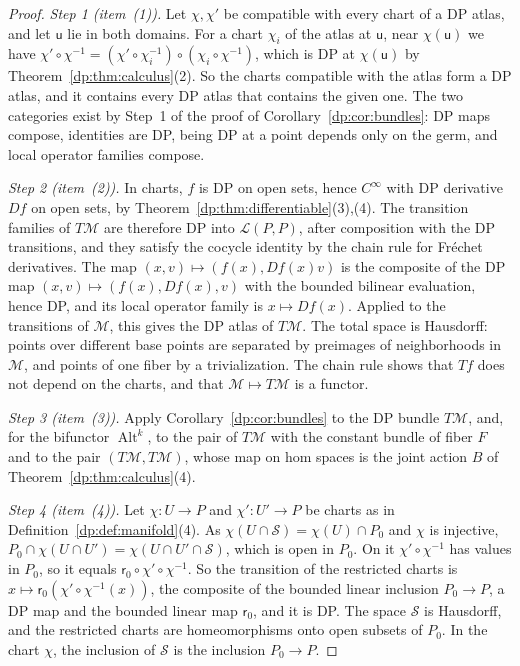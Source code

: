 \documentclass[11pt]{amsart}
\theoremstyle{definition}
\theoremstyle{remark}
\numberwithin{equation}{section}
\newcommand{\cL}{\mathcal L}
\newcommand{\Alt}{\operatorname{Alt}}
\theoremstyle{plain}
\theoremstyle{definition}
\theoremstyle{plain}
\newcommand{\cS}{\mathcal S}
\begin{document}
\begin{proof}
\emph{Step 1 (item~(1)).} Let $\chi,\chi'$ be compatible with every chart of a DP atlas, and let $\mathsf u$ lie in both domains. For a chart $\chi_i$ of the atlas at $\mathsf u$, near $\chi(\mathsf u)$ we have $\chi'\circ\chi^{-1}=(\chi'\circ\chi_i^{-1})\circ(\chi_i\circ\chi^{-1})$, which is DP at $\chi(\mathsf u)$ by Theorem~\ref{dp:thm:calculus}(2). So the charts compatible with the atlas form a DP atlas, and it contains every DP atlas that contains the given one. The two categories exist by Step~1 of the proof of Corollary~\ref{dp:cor:bundles}: DP maps compose, identities are DP, being DP at a point depends only on the germ, and local operator families compose.

\emph{Step 2 (item~(2)).} In charts, $f$ is DP on open sets, hence $C^\infty$ with DP derivative $Df$ on open sets, by Theorem~\ref{dp:thm:differentiable}(3),(4). The transition families of $T\mathcal M$ are therefore DP into $\cL(P,P)$, after composition with the DP transitions, and they satisfy the cocycle identity by the chain rule for Fr\'echet derivatives. The map $(x,v)\mapsto(f(x),Df(x)v)$ is the composite of the DP map $(x,v)\mapsto(f(x),Df(x),v)$ with the bounded bilinear evaluation, hence DP, and its local operator family is $x\mapsto Df(x)$. Applied to the transitions of $\mathcal M$, this gives the DP atlas of $T\mathcal M$. The total space is Hausdorff: points over different base points are separated by preimages of neighborhoods in $\mathcal M$, and points of one fiber by a trivialization. The chain rule shows that $Tf$ does not depend on the charts, and that $\mathcal M\mapsto T\mathcal M$ is a functor.

\emph{Step 3 (item~(3)).} Apply Corollary~\ref{dp:cor:bundles} to the DP bundle $T\mathcal M$, and, for the bifunctor $\Alt^k$, to the pair of $T\mathcal M$ with the constant bundle of fiber $F$ and to the pair $(T\mathcal M,T\mathcal M)$, whose map on hom spaces is the joint action $B$ of Theorem~\ref{dp:thm:calculus}(4).

\emph{Step 4 (item~(4)).} Let $\chi\colon U\to P$ and $\chi'\colon U'\to P$ be charts as in Definition~\ref{dp:def:manifold}(4). As $\chi(U\cap\cS)=\chi(U)\cap P_0$ and $\chi$ is injective, $P_0\cap\chi(U\cap U')=\chi(U\cap U'\cap\cS)$, which is open in $P_0$. On it $\chi'\circ\chi^{-1}$ has values in $P_0$, so it equals $\mathsf r_0\circ\chi'\circ\chi^{-1}$. So the transition of the restricted charts is $x\mapsto\mathsf r_0(\chi'\circ\chi^{-1}(x))$, the composite of the bounded linear inclusion $P_0\to P$, a DP map and the bounded linear map $\mathsf r_0$, and it is DP. The space $\cS$ is Hausdorff, and the restricted charts are homeomorphisms onto open subsets of $P_0$. In the chart $\chi$, the inclusion of $\cS$ is the inclusion $P_0\to P$.
\end{proof}
\end{document}
